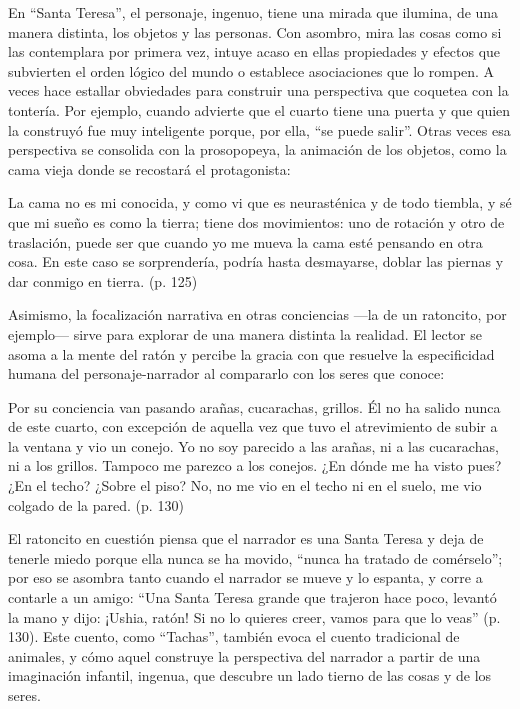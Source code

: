 \documentclass[14pt,twoside,final]{extbook} %
\begin{document}
En ``Santa Teresa'', el personaje, ingenuo, tiene una mirada que ilumina, de una manera distinta, los objetos y las personas. Con asombro, mira las cosas como si las contemplara por primera vez, intuye acaso en ellas propiedades y efectos que subvierten el orden lógico del mundo o establece asociaciones que lo rompen. A veces hace estallar obviedades para construir una perspectiva que coquetea con la tontería. Por ejemplo, cuando advierte que el cuarto tiene una puerta y que quien la construyó fue muy inteligente porque, por ella, ``se puede salir''. Otras veces esa perspectiva se consolida con la prosopopeya, la animación de los objetos, como la cama vieja donde se recostará el protagonista:\protect\enlargethispage*{\baselineskip}
\begin{quoting}
La cama no es mi conocida, y como vi que es neurasténica y de todo tiembla, y sé que mi sueño es como la tierra; tiene dos movimientos: uno de rotación y otro de traslación, puede ser que cuando yo me mueva la cama esté pensando en otra cosa. En este caso se sorprendería, podría hasta desmayarse, doblar las piernas y dar conmigo en tierra. (p. 125)
\end{quoting}
Asimismo, la focalización narrativa en otras conciencias ---la de un ratoncito, por ejemplo--- sirve para explorar de una manera distinta la realidad. El lector se asoma a la mente del ratón y percibe la gracia con que resuelve la especificidad humana del personaje-narrador al compararlo con los seres que conoce:
\begin{quoting}
Por su conciencia van pasando arañas, cucarachas, grillos. Él no ha salido nunca de este cuarto, con excepción de aquella vez que tuvo el atrevimiento de subir a la ventana y vio un conejo. Yo no soy parecido a las arañas, ni a las cucarachas, ni a los grillos. Tampoco me parezco a los conejos. ¿En dónde me ha visto pues? ¿En el techo? ¿Sobre el piso? No, no me vio en el techo ni en el suelo, me vio colgado de la pared. (p. 130)
\end{quoting}
El ratoncito en cuestión piensa que el narrador es una Santa Teresa y deja de tenerle miedo porque ella nunca se ha movido, ``nunca ha tratado de comérselo''; por eso se asombra tanto cuando el narrador se mueve y lo espanta, y corre a contarle a un amigo: ``Una Santa Teresa grande que trajeron hace poco, levantó la mano y dijo: ¡Ushia, ratón! Si no lo quieres creer, vamos para que lo veas'' (p. 130). Este cuento, como ``Tachas'', también evoca el cuento tradicional de animales, y cómo aquel construye la perspectiva del narrador a partir de una imaginación infantil, ingenua, que descubre un lado tierno de las cosas y de los seres.
\end{document}

